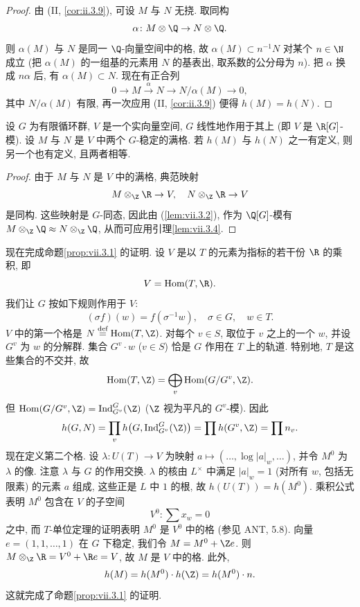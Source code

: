 \begin{proof}
由 (II, \ref{cor:ii.3.9}), 可设 $M$ 与 $N$ 无挠. 取同构
\[
\alpha\colon M\otimes\Q\to N\otimes\Q.
\]
则 $\alpha(M)$ 与 $N$ 是同一 $\Q$-向量空间中的格, 故 $\alpha(M)\subset n^{-1}N$ 对某个 $n\in\N$ 成立 (把 $\alpha(M)$ 的一组基的元素用 $N$ 的基表出, 取系数的公分母为 $n$). 把 $\alpha$ 换成 $n\alpha$ 后, 有 $\alpha(M)\subset N$. 现在有正合列
\[
0\to M\xrightarrow{\alpha}N\to N/\alpha(M)\to 0,
\]
其中 $N/\alpha(M)$ 有限, 再一次应用 (II, \ref{cor:ii.3.9}) 便得 $h(M)=h(N)$.
\end{proof}

\begin{lemma}\label{lem:vii.3.5}
设 $G$ 为有限循环群, $V$ 是一个实向量空间, $G$ 线性地作用于其上 (即 $V$ 是 $\R[G]$-模). 设 $M$ 与 $N$ 是 $V$ 中两个 $G$-稳定的满格. 若 $h(M)$ 与 $h(N)$ 之一有定义, 则另一个也有定义, 且两者相等.
\end{lemma}

\begin{proof}
由于 $M$ 与 $N$ 是 $V$ 中的满格, 典范映射
\[
M\otimes_{\Z}\R\to V,\quad N\otimes_{\Z}\R\to V
\]
是同构. 这些映射是 $G$-同态, 因此由 (\ref{lem:vii.3.2}), 作为 $\Q[G]$-模有 $M\otimes_{\Z}\Q\approx N\otimes_{\Z}\Q$, 从而可应用引理\ref{lem:vii.3.4}.
\end{proof}

现在完成命题\ref{prop:vii.3.1} 的证明. 设 $V$ 是以 $T$ 的元素为指标的若干份 $\R$ 的乘积, 即
\[
V=\operatorname{Hom}(T,\R).
\]
我们让 $G$ 按如下规则作用于 $V$:
\[
(\sigma f)(w)=f(\sigma^{-1}w),\quad\sigma\in G,\quad w\in T.
\]
$V$ 中的第一个格是 $N\overset{\text{def}}{=}\operatorname{Hom}(T,\Z)$. 对每个 $v\in S$, 取位于 $v$ 之上的一个 $w$, 并设 $G^v$ 为 $w$ 的分解群. 集合 $G^{v}\cdot w$ ($v\in S$) 恰是 $G$ 作用在 $T$ 上的轨道. 特别地, $T$ 是这些集合的不交并, 故
\[
\operatorname{Hom}(T,\Z)=\bigoplus_{v}\operatorname{Hom}(G/G^{v},\Z).
\]
但 $\operatorname{Hom}(G/G^{v},\Z)=\operatorname{Ind}_{G^{v}}^{G}(\Z)$ ($\Z$ 视为平凡的 $G^v$-模). 因此
\[
h(G,N)=\prod_{v}h\bigl(G,\operatorname{Ind}_{G^{v}}^{G}(\Z)\bigr)=\prod h(G^{v},\Z)=\prod n_{v}.
\]
现在定义第二个格. 设 $\lambda\colon U(T)\to V$ 为映射 $a\mapsto(\ldots,\log|a|_{w},\ldots)$, 并令 $M^{0}$ 为 $\lambda$ 的像. 注意 $\lambda$ 与 $G$ 的作用交换. $\lambda$ 的核由 $L^{\times}$ 中满足 $|a|_{w}=1$ (对所有 $w$, 包括无限素) 的元素 $a$ 组成, 这些正是 $L$ 中 $1$ 的根, 故 $h(U(T))=h(M^{0})$. 乘积公式表明 $M^{0}$ 包含在 $V$ 的子空间
\[
V^{0}\colon\sum x_{w}=0
\]
之中, 而 $T$-单位定理的证明表明 $M^{0}$ 是 $V^0$ 中的格 (参见 ANT, 5.8). 向量 $e=(1,1,\ldots,1)$ 在 $G$ 下稳定, 我们令 $M=M^{0}+\Z e$. 则 $M\otimes_{\Z}\R=V^{0}+\R e=V$, 故 $M$ 是 $V$ 中的格. 此外,
\[
h(M)=h(M^{0})\cdot h(\Z)=h(M^{0})\cdot n.
\]
这就完成了命题\ref{prop:vii.3.1} 的证明.

